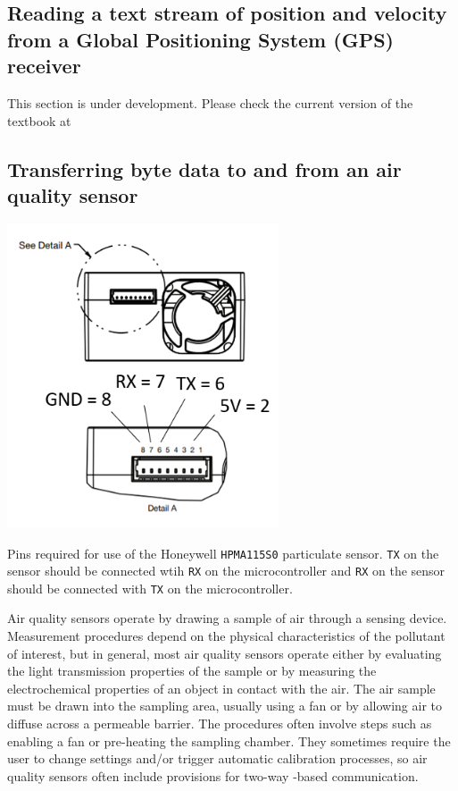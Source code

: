 \subsection{\color{gray} Reading a text stream of position and velocity from a Global Positioning System (GPS) receiver}
This section is under development.  Please check the current version of the textbook at 


\subsection{Transferring byte data to and from an air quality sensor}

\begin{marginfigure}[-7cm]
	\begin{center}
		\includegraphics[height=9cm]{Images/HPMA115S0.png}
		\caption[HPMA115S0]{Pins required for use of the Honeywell \texttt{HPMA115S0} particulate sensor.
\texttt{TX} on the sensor should be connected wtih \texttt{RX} on the microcontroller and \texttt{RX} on the sensor should be connected with \texttt{TX} on the microcontroller.}
	\end{center}
\end{marginfigure}

Air quality sensors operate by drawing a sample of air through a sensing device.
Measurement procedures depend on the physical characteristics of the pollutant of interest, but in general, most air quality sensors operate either by evaluating the light transmission properties of the sample or by measuring the electrochemical properties of an object in contact with the air.
The air sample must be drawn into the sampling area, usually using a fan or by allowing air to diffuse across a permeable barrier.
The procedures often involve steps such as enabling a fan or pre-heating the sampling chamber.
They sometimes require the user to change settings and/or trigger automatic calibration processes, so air quality sensors often include provisions for two-way \uart -based communication.


